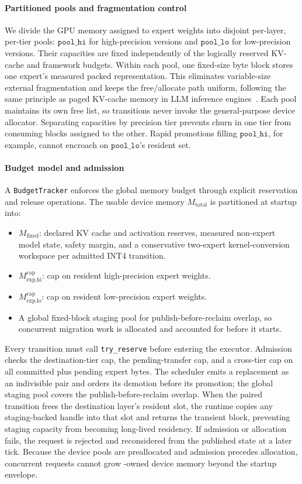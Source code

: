 \paragraph{Partitioned pools and fragmentation control}
We divide the GPU memory assigned to expert weights into disjoint per-layer, per-tier pools: $\texttt{pool\_hi}$ for high-precision versions and $\texttt{pool\_lo}$ for low-precision versions. Their capacities are fixed independently of the logically reserved KV-cache and framework budgets. Within each pool, one fixed-size byte block stores one expert's measured packed representation. This eliminates variable-size external fragmentation and keeps the free/allocate path uniform, following the same principle as paged KV-cache memory in LLM inference engines~\cite{kwon2023vllm}. Each pool maintains its own free list, so transitions never invoke the general-purpose device allocator. Separating capacities by precision tier prevents churn in one tier from consuming blocks assigned to the other. Rapid promotions filling $\texttt{pool\_hi}$, for example, cannot encroach on $\texttt{pool\_lo}$'s resident set.

\paragraph{Budget model and admission}
A \texttt{BudgetTracker} enforces the global memory budget through explicit reservation and release operations. The usable device memory $M_{\text{total}}$ is partitioned at startup into:
\begin{itemize}[leftmargin=1.5em, itemsep=0pt, topsep=2pt]
\item $M_{\text{fixed}}$: declared KV cache and activation reserves, measured non-expert model state, safety margin, and a conservative two-expert kernel-conversion workspace per admitted INT4 transition.
\item $M_{\text{exp,hi}}^{\text{cap}}$: cap on resident high-precision expert weights.
\item $M_{\text{exp,lo}}^{\text{cap}}$: cap on resident low-precision expert weights.
\item A global fixed-block staging pool for publish-before-reclaim overlap, so concurrent migration work is allocated and accounted for before it starts.
\end{itemize}
Every transition must call \texttt{try\_reserve} before entering the executor. Admission checks the destination-tier cap, the pending-transfer cap, and a cross-tier cap on all committed plus pending expert bytes. The scheduler emits a replacement as an indivisible pair and orders its demotion before its promotion; the global staging pool covers the publish-before-reclaim overlap. When the paired transition frees the destination layer's resident slot, the runtime copies any staging-backed handle into that slot and returns the transient block, preventing staging capacity from becoming long-lived residency. If admission or allocation fails, the request is rejected and reconsidered from the published state at a later tick. Because the device pools are preallocated and admission precedes allocation, concurrent requests cannot grow \systemname-owned device memory beyond the startup envelope.

